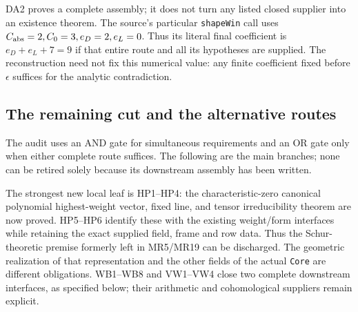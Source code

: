 DA2 proves a complete assembly; it does not turn any listed closed
supplier into an existence theorem.  The source's particular
\texttt{shapeWin} call uses $C_{\rm abs}=2,C_0=3,e_D=2,e_L=0$.
Thus its literal final coefficient is $e_D+e_L+7=9$ if that entire
route and all its hypotheses are supplied.  The reconstruction need
not fix this numerical value: any finite coefficient fixed before
$\epsilon$ suffices for the analytic contradiction.

\subsection{The remaining cut and the alternative routes}

The audit uses an AND gate for simultaneous requirements and an OR gate
only when either complete route suffices.  The following are the main
branches; none can be retired solely because its downstream assembly
has been written.

The strongest new local leaf is HP1--HP4: the characteristic-zero
canonical polynomial highest-weight vector, fixed line, and tensor
irreducibility theorem are now proved.  HP5--HP6 identify these with
the existing weight/form interfaces while retaining the exact supplied
field, frame and row data.  Thus the Schur-theoretic premise formerly
left in MR5/MR19 can be discharged.  The geometric realization of that
representation and the other fields of the actual \texttt{Core} are
different obligations.  WB1--WB8 and VW1--VW4 close two complete
downstream interfaces, as specified below; their arithmetic and
cohomological suppliers remain explicit.

